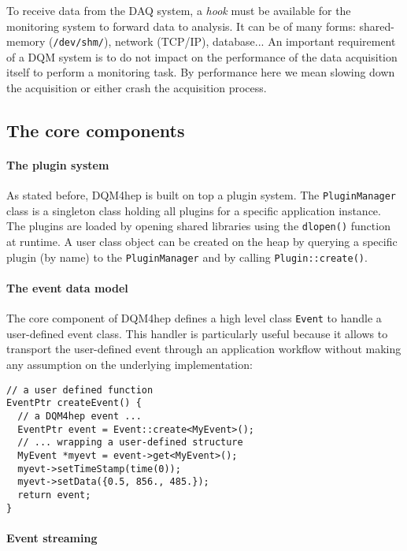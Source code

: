 \documentclass{webofc}
\begin{document}
To receive data from the DAQ system, a \textit{hook} must be available for the monitoring system to forward data to analysis. It can be of many forms: shared-memory (\texttt{/dev/shm/}), network (TCP/IP), database... An important requirement of a DQM system is to do not impact on the performance of the data acquisition itself to perform a monitoring task. By performance here we mean slowing down the acquisition or either crash the acquisition process.

\subsection{The core components}
\label{subsec:core}

\paragraph{The plugin system}

As stated before, DQM4hep is built on top a plugin system. The \texttt{PluginManager} class is a singleton class holding all plugins for a specific application instance. The plugins are loaded by opening shared libraries using the \texttt{dlopen()} function at runtime. A user class object can be created on the heap by querying a specific plugin (by name) to the \texttt{PluginManager} and by calling \texttt{Plugin::create()}.

\paragraph{The event data model}

The core component of DQM4hep defines a high level class \texttt{Event} to handle a user-defined event class. This handler is particularly useful because it allows to transport the user-defined event through an application workflow without making any assumption on the underlying implementation:

\begin{lstlisting}
// a user defined function
EventPtr createEvent() {
  // a DQM4hep event ...
  EventPtr event = Event::create<MyEvent>();
  // ... wrapping a user-defined structure
  MyEvent *myevt = event->get<MyEvent>();
  myevt->setTimeStamp(time(0));
  myevt->setData({0.5, 856., 485.});
  return event;
}
\end{lstlisting}

\paragraph{Event streaming}
\end{document}
